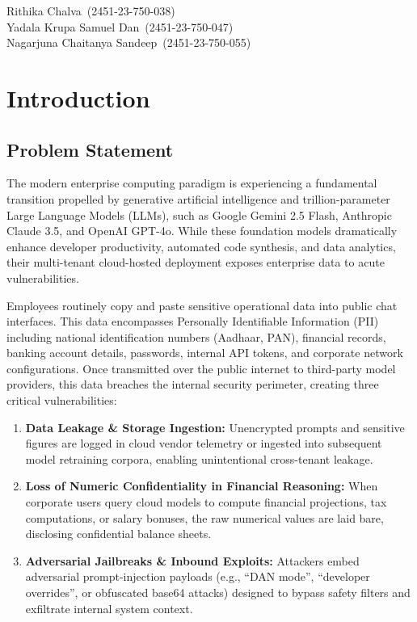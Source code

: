 \documentclass[12pt,a4paper,oneside]{report}
\newcommand{\StudentOne}{Rithika Chalva}
\newcommand{\RollOne}{2451-23-750-038}
\newcommand{\StudentTwo}{Yadala Krupa Samuel Dan}
\newcommand{\RollTwo}{2451-23-750-047}
\newcommand{\StudentThree}{Nagarjuna Chaitanya Sandeep}
\newcommand{\RollThree}{2451-23-750-055}
\numberwithin{equation}{chapter}
\begin{document}
\vfill
\begin{flushright}
\StudentOne\ (\RollOne)\\\StudentTwo\ (\RollTwo)\\\StudentThree\ (\RollThree)
\end{flushright}

\clearpage\tableofcontents
\clearpage\listoftables
\clearpage\listoffigures

\clearpage{}\setcounter{page}{1}\pagestyle{chapterpages}
\chapter{Introduction}

\section{Problem Statement}
The modern enterprise computing paradigm is experiencing a fundamental transition propelled by generative artificial intelligence and trillion-parameter Large Language Models (LLMs), such as Google Gemini 2.5 Flash, Anthropic Claude 3.5, and OpenAI GPT-4o. While these foundation models dramatically enhance developer productivity, automated code synthesis, and data analytics, their multi-tenant cloud-hosted deployment exposes enterprise data to acute vulnerabilities.

Employees routinely copy and paste sensitive operational data into public chat interfaces. This data encompasses Personally Identifiable Information (PII) including national identification numbers (Aadhaar, PAN), financial records, banking account details, passwords, internal API tokens, and corporate network configurations. Once transmitted over the public internet to third-party model providers, this data breaches the internal security perimeter, creating three critical vulnerabilities:
\begin{enumerate}[leftmargin=*]
    \item \textbf{Data Leakage \& Storage Ingestion:} Unencrypted prompts and sensitive figures are logged in cloud vendor telemetry or ingested into subsequent model retraining corpora, enabling unintentional cross-tenant leakage.
    \item \textbf{Loss of Numeric Confidentiality in Financial Reasoning:} When corporate users query cloud models to compute financial projections, tax computations, or salary bonuses, the raw numerical values are laid bare, disclosing confidential balance sheets.
    \item \textbf{Adversarial Jailbreaks \& Inbound Exploits:} Attackers embed adversarial prompt-injection payloads (e.g., ``DAN mode'', ``developer overrides'', or obfuscated base64 attacks) designed to bypass safety filters and exfiltrate internal system context.
\end{enumerate}
\end{document}
